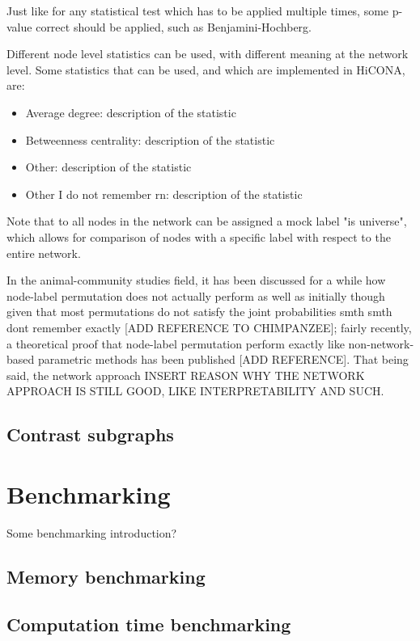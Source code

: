 Just like for any statistical test which has to be applied multiple times, some p-value correct should be applied, such as Benjamini-Hochberg.

Different node level statistics can be used, with different meaning at the network level. Some statistics that can be used, and which are implemented in HiCONA, are:
\begin{itemize}\tightlist
  \item Average degree: description of the statistic
  \item Betweenness centrality: description of the statistic
  \item Other: description of the statistic
  \item Other I do not remember rn: description of the statistic
\end{itemize}

Note that to all nodes in the network can be assigned a mock label "is universe", which allows for comparison of nodes with a specific label with respect to the entire network.

In the animal-community studies field, it has been discussed for a while how node-label permutation does not actually perform as well as initially though given that most permutations do not satisfy the joint probabilities smth smth dont remember exactly [ADD REFERENCE TO CHIMPANZEE]; fairly recently, a theoretical proof that node-label permutation perform exactly like non-network-based parametric methods has been published [ADD REFERENCE]. That being said, the network approach INSERT REASON WHY THE NETWORK APPROACH IS STILL GOOD, LIKE INTERPRETABILITY AND SUCH.

\subsection{Contrast subgraphs}

\section{Benchmarking}
Some benchmarking introduction?

\subsection{Memory benchmarking}

\subsection{Computation time benchmarking}

